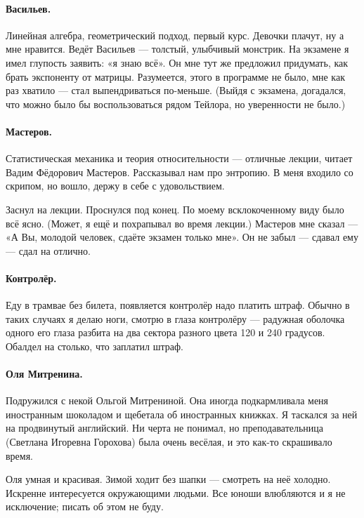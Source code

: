 \documentclass{book}
\begin{document}
\paragraph{Васильев.}
Линейная алгебра, 
геометрический подход, 
первый курс. 
Девочки плачут, ну а мне нравится.
Ведёт Васильев --- толстый, улыбчивый монстрик.
На экзамене я имел глупость заявить: «я знаю всё».
Он мне тут же предложил придумать, как брать экспоненту от матрицы.
Разумеется, этого в программе не было,
мне как раз хватило --- стал выпендриваться по-меньше.
(Выйдя с экзамена, догадался, что можно было бы воспользоваться рядом Тейлора, но уверенности не было.)

\paragraph{Мастеров.}
Статистическая механика и теория относительности --- отличные лекции, читает Вадим Фёдорович Мастеров.
Рассказывал нам про энтропию. 
В меня входило со скрипом, 
но вошло, держу в себе с удовольствием.

Заснул на лекции.
Проснулся под конец.
По моему всклокоченному виду было всё ясно.
(Может, я ещё и похрапывал во время лекции.)
Мастеров мне сказал --- «А Вы, молодой человек, сдаёте экзамен только мне».
Он не забыл --- сдавал ему --- сдал на отлично.

\paragraph{Контролёр.}
Еду в трамвае без билета,
появляется контролёр надо платить штраф.
Обычно в таких случаях я делаю ноги,
смотрю в глаза контролёру --- радужная оболочка одного его глаза разбита на два сектора разного цвета
120 и 240 градусов.
Обалдел на столько, что заплатил штраф.


\paragraph{Оля Митренина.}
Подружился с некой Ольгой Митрениной.
Она иногда подкармливала меня иностранным шоколадом и щебетала об иностранных книжках.
Я таскался за ней на продвинутый английский.
Ни черта не понимал, но преподавательница (Светлана Игоревна Горохова) была очень весёлая, и это как-то скрашивало время.

Оля умная и красивая.
Зимой ходит без шапки --- смотреть на неё холодно.
Искренне интересуется окружающими людьми.
Все юноши влюбляются и я не исключение; писать об этом не буду.
\end{document}
